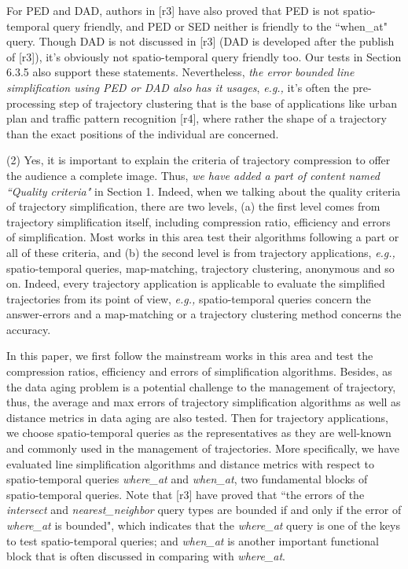 \documentclass{letter}
\newcommand{\eg}{\emph{e.g.,}\xspace}
\begin{document}
{For PED and DAD, authors in [r3] have also proved that PED is not spatio-temporal query friendly, and PED or SED neither is friendly to the ``when\_at" query. Though DAD is not discussed in [r3] (DAD is developed after the publish of [r3]), it's obviously not spatio-temporal query friendly too. Our tests in Section 6.3.5 also support these statements. Nevertheless, \emph{the error bounded line simplification using PED or DAD also has it usages}, \eg it's often the pre-processing step of trajectory clustering that is the base of applications like urban plan and traffic pattern recognition [r4], where rather the shape of a trajectory than the exact positions of the individual are concerned. 


(2) {Yes, it is important to explain the criteria of trajectory compression to offer the audience a complete image.} Thus, \emph{we have added a part of content named ``Quality criteria"} in Section 1. Indeed, when we talking about the quality criteria of trajectory simplification, there are two levels, 
(a) the first level comes from trajectory simplification itself, including compression ratio, efficiency and errors of simplification. Most works in this area test their algorithms following a part or all of these criteria, and 
(b) the second level is from trajectory applications, \eg spatio-temporal queries, map-matching, trajectory clustering, anonymous and so on. Indeed, every trajectory application is applicable to evaluate the simplified trajectories from its point of view, \eg spatio-temporal queries concern the answer-errors and a map-matching or a trajectory clustering method concerns the accuracy.

In this paper, we first follow the mainstream works in this area and test the compression ratios, efficiency and errors of simplification algorithms. 
Besides, as the data aging problem is a potential challenge to the management of trajectory, thus, the average and max errors of trajectory simplification algorithms as well as distance metrics in data aging are also tested.
%
Then for trajectory applications, we choose spatio-temporal queries as the representatives as they are well-known and commonly used in the management of trajectories.
More specifically, we have evaluated line simplification algorithms and distance metrics with respect to spatio-temporal queries \emph{where\_at} and \emph{when\_at}, two fundamental blocks of spatio-temporal queries. Note that [r3] have proved that ``the errors of the \emph{intersect} and \emph{nearest\_neighbor} query types are bounded if and only if the error of \emph{where\_at} is bounded", which indicates that the \emph{where\_at} query is one of the keys to test spatio-temporal queries; and \emph{when\_at} is another important functional block that is often discussed in comparing with \emph{where\_at}.

}
\end{document}
